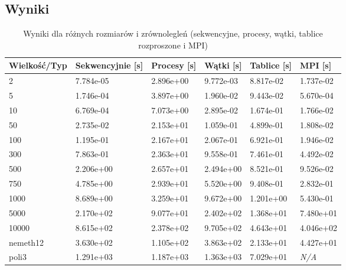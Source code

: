 \subsection{Wyniki}
\begin{table}[H]
    \centering
    \begin{tabular}{|l|l|l|l|l|l|}
    \hline
    \textbf{Wielkość/Typ} & \textbf{Sekwencyjnie [s]} & \textbf{Procesy [s]} & \textbf{Wątki [s]} & \textbf{Tablice [s]} & \textbf{MPI [s]} \\ \hline
    2    & 7.784e-05             & 2.896e+00             & 9.772e-03             & 8.817e-02             & 1.737e-02             \\ \hline
    5    & 1.746e-04             & 3.897e+00             & 1.960e-02             & 9.443e-02             & 5.670e-04             \\ \hline
    10   & 6.769e-04             & 7.073e+00             & 2.895e-02             & 1.674e-01             & 1.766e-02             \\ \hline
    50   & 2.735e-02             & 2.153e+01             & 1.059e-01             & 4.899e-01             & 1.808e-02             \\ \hline
    100  & 1.195e-01             & 2.167e+01             & 2.067e-01             & 6.921e-01             & 1.946e-02             \\ \hline
    300  & 7.863e-01             & 2.363e+01             & 9.558e-01             & 7.461e-01             & 4.492e-02             \\ \hline
    500  & 2.206e+00             & 2.657e+01             & 2.494e+00             & 8.521e-01             & 9.526e-02             \\ \hline
    750  & 4.785e+00             & 2.939e+01             & 5.520e+00             & 9.408e-01             & 2.832e-01             \\ \hline
    1000 & 8.689e+00             & 3.259e+01             & 9.672e+00             & 1.201e+00             & 5.430e-01             \\ \hline
    5000 & 2.170e+02             & 9.077e+01             & 2.402e+02             & 1.368e+01             & 7.480e+01             \\ \hline
    10000 & 8.615e+02            & 2.378e+02             & 9.705e+02             & 4.643e+01             & 4.046e+02             \\ \hline
    nemeth12 & 3.630e+02         & 1.105e+02             & 3.863e+02             & 2.133e+01            & 4.427e+01            \\ \hline
    poli3 & 1.291e+03             & 1.187e+03             & 1.363e+03             & 7.029e+01            & \textit{N/A}         \\ \hline
    \end{tabular}
    \caption{Wyniki dla różnych rozmiarów i zrównolegleń (sekwencyjne, procesy, wątki, tablice rozproszone i MPI)}
    \label{tab:test_results_full}
\end{table}

